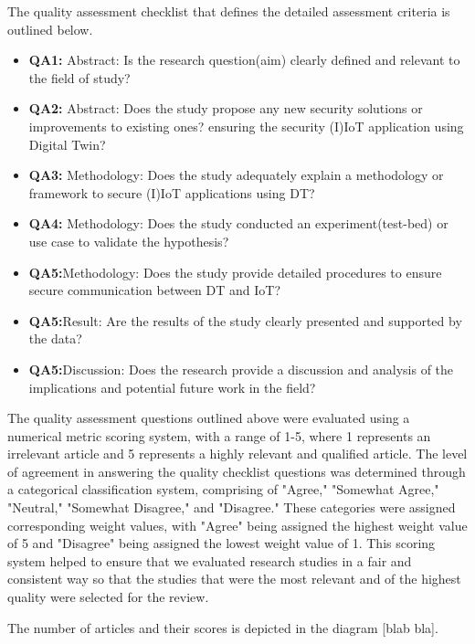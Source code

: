 The quality assessment checklist that defines the detailed assessment criteria  is outlined below.
\begin{itemize}
    \item \textbf{QA1:} Abstract: Is the research question(aim) clearly defined and relevant to the field of study?
    \item \textbf{QA2:} Abstract: Does the study propose any new security solutions or improvements to existing ones? ensuring the security (I)IoT application using Digital Twin?
    \item \textbf{QA3:} Methodology: Does the study adequately explain a methodology or framework to secure (I)IoT applications using DT?
    \item \textbf{QA4:} Methodology: Does the study conducted an experiment(test-bed) or use case to validate the hypothesis?
    \item \textbf{QA5:}Methodology: Does the study provide detailed procedures to ensure secure communication between DT and IoT?
    \item \textbf{QA5:}Result: Are the results of the study clearly presented and supported by the data?
    \item \textbf{QA5:}Discussion: Does the research provide a discussion and analysis of the implications and potential future work in the field?
\end{itemize}
The quality assessment questions outlined above were evaluated using a numerical metric scoring system, with a range of 1-5, where 1 represents an irrelevant article and 5 represents a highly relevant and qualified article. The level of agreement in answering the quality checklist questions was determined through a categorical classification system, comprising of "Agree," "Somewhat Agree," "Neutral," "Somewhat Disagree," and "Disagree." These categories were assigned corresponding weight values, with "Agree" being assigned the highest weight value of 5 and "Disagree" being assigned the lowest weight value of 1. This scoring system helped to ensure that we evaluated research studies in a fair and consistent way so that the studies that were the most relevant and of the highest quality were selected for the review.

The number of articles and their scores is depicted in the diagram [blab bla]. 
